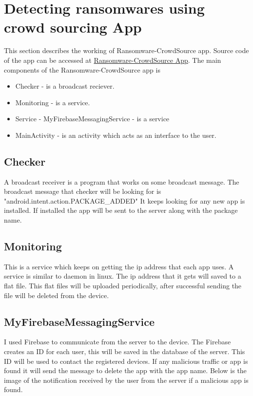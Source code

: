 \section{Detecting ransomwares using crowd sourcing App}

This section describes the working of Ransomware-CrowdSource app.
Source code of the app can be accessed at \href{https://github.com/jithin005/Ransomware-CrowdSource}{Ransomware-CrowdSource App}.
The main components of the Ransomware-CrowdSource app is 
\begin{itemize}
    \item Checker - is a broadcast reciever.
    \item Monitoring - is a service.
    \item Service - MyFirebaseMessagingService - is a service
    \item MainActivity - is an activity which acts as an interface to the user.
\end{itemize}

\subsection{Checker}

\par A broadcast receiver is a program that works on some broadcast message.
The broadcast message that checker will be looking for is \\
"android.intent.action.PACKAGE\_ADDED"
It keeps looking for any new app is installed.
If installed the app will be sent to the server along with the package name.



\subsection{Monitoring}

\par This is a service which keeps on getting the ip address that each app uses.
A service is similar to daemon in linux.
The ip address that it gets will saved to a flat file.
This flat files will be uploaded periodically, after successful sending the file will be deleted from the device.

\subsection{MyFirebaseMessagingService}

\par I used Firebase to communicate from the server to the device.
The Firebase creates an ID for each user, this will be saved in the database of the server.
This ID will be used to contact the registered devices.
If any malicious traffic or app is found it will send the message to delete the app with the app name.
Below is the image of the notification received by the user from the server if a malicious app is found. 

